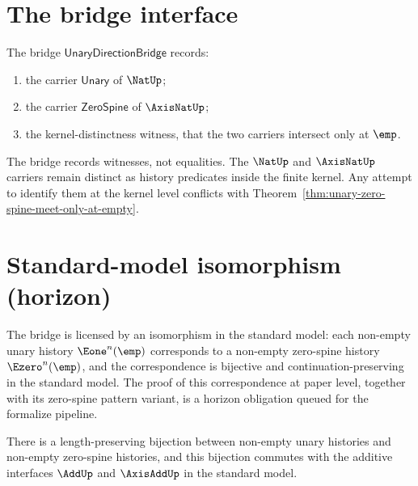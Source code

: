 \section{The bridge interface}

\begin{definition}
\label{def:unary-direction-bridge}
The bridge \(\mathsf{UnaryDirectionBridge}\) records:
\begin{enumerate}
  \item the carrier \(\mathsf{Unary}\) of \(\NatUp\);
  \item the carrier \(\mathsf{ZeroSpine}\) of \(\AxisNatUp\);
  \item the kernel-distinctness witness, that the two carriers intersect only at \(\emp\).
\end{enumerate}
\end{definition}

\begin{remark}
The bridge records witnesses, not equalities. The \(\NatUp\) and \(\AxisNatUp\) carriers remain distinct as history predicates inside the finite kernel. Any attempt to identify them at the kernel level conflicts with Theorem~\ref{thm:unary-zero-spine-meet-only-at-empty}.
\end{remark}

\section{Standard-model isomorphism (horizon)}

The bridge is licensed by an isomorphism in the standard model: each non-empty unary history \(\Eone^n(\emp)\) corresponds to a non-empty zero-spine history \(\Ezero^n(\emp)\), and the correspondence is bijective and continuation-preserving in the standard model. The proof of this correspondence at paper level, together with its zero-spine pattern variant, is a horizon obligation queued for the formalize pipeline.

\begin{theorem}
\label{thm:unary-zero-spine-standard-model-isomorphism}
There is a length-preserving bijection between non-empty unary histories and non-empty zero-spine histories, and this bijection commutes with the additive interfaces \(\AddUp\) and \(\AxisAddUp\) in the standard model.
\end{theorem}


